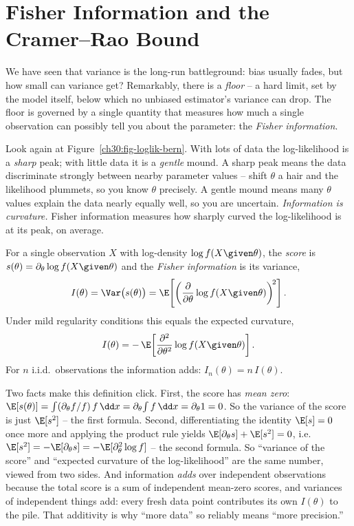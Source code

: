 \section{Fisher Information and the Cramer--Rao Bound}
\label{ch30:fisher}

We have seen that variance is the long-run battleground: bias usually fades, but
how small can variance get? Remarkably, there is a \emph{floor} -- a hard limit,
set by the model itself, below which no unbiased estimator's variance can drop.
The floor is governed by a single quantity that measures how much a single
observation can possibly tell you about the parameter: the \emph{Fisher
information}.

\begin{intuitionbox}
Look again at Figure~\ref{ch30:fig-loglik-bern}. With lots of data the
log-likelihood is a \emph{sharp} peak; with little data it is a \emph{gentle}
mound. A sharp peak means the data discriminate strongly between nearby
parameter values -- shift $\theta$ a hair and the likelihood plummets, so you
know $\theta$ precisely. A gentle mound means many $\theta$ values explain the
data nearly equally well, so you are uncertain. \emph{Information is curvature.}
Fisher information measures how sharply curved the log-likelihood is at its peak,
on average.
\end{intuitionbox}

\begin{definition}
\label{ch30:def-fisher}
For a single observation $X$ with log-density $\log f(X\given\theta)$, the
\emph{score} is $s(\theta)=\partial_\theta \log f(X\given\theta)$ and the
\emph{Fisher information} is its variance,
\[
  I(\theta) = \Var\big(s(\theta)\big)
            = \E\!\left[\left(\frac{\partial}{\partial\theta}\log f(X\given\theta)\right)^{\!2}\right].
\]
Under mild regularity conditions this equals the expected curvature,
\[
  I(\theta) = -\,\E\!\left[\frac{\partial^2}{\partial\theta^2}\log f(X\given\theta)\right].
\]
For $n$ i.i.d.\ observations the information adds: $I_n(\theta)=n\,I(\theta)$.
\end{definition}

\begin{whybox}
Two facts make this definition click. First, the score has \emph{mean zero}:
$\E[s(\theta)]=\int (\partial_\theta f/f)\,f\,\dd x
= \partial_\theta\!\int f\,\dd x = \partial_\theta 1 = 0$. So the variance of the
score is just $\E[s^2]$ -- the first formula. Second, differentiating the
identity $\E[s]=0$ once more and applying the product rule yields
$\E[\partial_\theta s] + \E[s^2]=0$, i.e.\
$\E[s^2] = -\E[\partial_\theta s] = -\E[\partial_\theta^2 \log f]$ -- the second
formula. So ``variance of the score'' and ``expected curvature of the
log-likelihood'' are the same number, viewed from two sides. And information
\emph{adds} over independent observations because the total score is a sum of
independent mean-zero scores, and variances of independent things add: every
fresh data point contributes its own $I(\theta)$ to the pile. That additivity is
why ``more data'' so reliably means ``more precision.''
\end{whybox}

